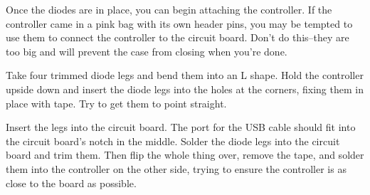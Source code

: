 \documentclass{article}
\begin{document}
Once the diodes are in place, you can begin attaching the controller.
If the controller came in a pink bag with its own header pins, you may
be tempted to use them to connect the controller to the circuit
board. Don't do this--they are too big and will prevent the case from
closing when you're done.

\vspace{1em}

Take four trimmed diode legs and bend them into an L shape. Hold the
controller upside down and insert the diode legs into the holes at the
corners, fixing them in place with tape. Try to get them to point straight.

\vspace{1em}
\noindent{}
\vspace{1em}

Insert the legs into the circuit board. The port for the USB cable
should fit into the circuit board's notch in the middle. Solder the
diode legs into the circuit board and trim them. Then flip the whole
thing over, remove the tape, and solder them into the controller on
the other side, trying to ensure the controller is as close to the
board as possible.

\vspace{1em}
\noindent{}
\vspace{1em}
\end{document}
